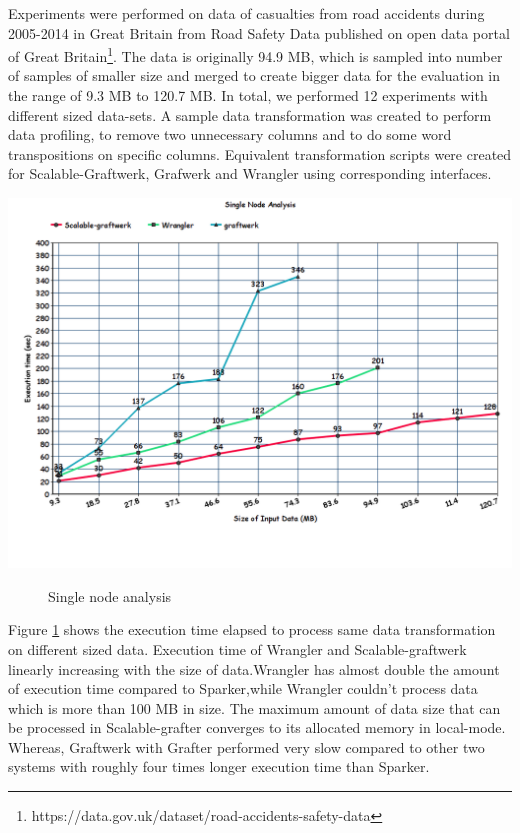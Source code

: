 Experiments were performed on data of casualties from road accidents during 2005-2014 in Great Britain from Road Safety Data published on open data portal of Great Britain\footnote{https://data.gov.uk/dataset/road-accidents-safety-data}. The data is originally 94.9 MB, which is sampled into number of samples of smaller size and merged to create bigger data for the evaluation in the range of 9.3 MB to 120.7 MB. In total, we performed 12 experiments with different sized data-sets. A sample data transformation was created to perform data profiling, to remove two unnecessary columns and to do some word transpositions on specific columns. Equivalent transformation scripts were created for Scalable-Graftwerk, Grafwerk and Wrangler using corresponding interfaces. 
\begin{center}
	\includegraphics[width=38em]{./Figures/single-node}
	\begin{figure}[htbp]
    \caption{Single node analysis}
    \label{fig:singlenode}
	\end{figure}
\end{center}
Figure \ref{fig:singlenode} shows the execution time elapsed to process same data transformation on different sized data. Execution time of Wrangler and Scalable-graftwerk linearly increasing with the size of data.Wrangler has almost double the amount of execution time compared to Sparker,while Wrangler couldn't process data which is more than 100 MB in size. The maximum amount of data size that can be processed in Scalable-grafter converges to its allocated memory in local-mode. Whereas, Graftwerk with Grafter performed very slow compared to other two systems with roughly four times longer execution time than Sparker.

